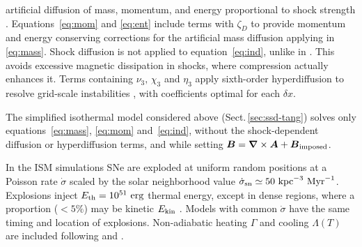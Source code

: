 \documentclass[preprint2]{aastex63}
\newcommand\SNr{\dot\sigma_{\rm sn}}
\newcommand\ESK{E_{\rm kin}}
\newcommand\EST{E_{\rm th}}
\newcommand{\vect}[1]{{{\mbox{\boldmath $#1$}}}}%
\newcommand\kpc{~ {\rm kpc}}
\newcommand\dx{ {\delta x}}
\newcommand\Myr{~ {\rm Myr}}
\newcommand\erg{~ {\rm erg}}
\newcommand{\fg}[1]{\textcolor{midgreen}{#1}}
\begin{document}
 artificial diffusion of mass, momentum, and energy proportional to shock
 strength \citep[see][for details]{GMKSH20}.
 \fg{Equations~\eqref{eq:mom} and \eqref{eq:ent} include terms with $\zeta_D$}
 \fg{to} \fg{provide momentum and energy conserving corrections for} \fg{the}
 \fg{artificial mass diffusion applying in \eqref{eq:mass}.}
 Shock diffusion is not applied to equation~\eqref{eq:ind}\fg{, unlike} \fg{in}
 \fg{\citet{Gent:2013b}.} \fg{This avoids} \fg{excessive magnetic dissipation in
 shocks, where compression actually enhances it.}
 Terms containing $\nu_3,\,\chi_3$ and $\eta_3$ apply sixth-order hyperdiffusion
 to resolve grid-scale instabilities \citep[see, e.g.,][]{ABGS02,HB04}, \fg{
 with coefficients optimal for each $\dx$}.

 \fg{The simplified isothermal model considered above
 (Sect.\,\ref{sec:ssd-tang}) solves only equations~\fg{\eqref{eq:mass},}
 \eqref{eq:mom} and~\eqref{eq:ind}, without the shock-dependent diffusion or
 hyperdiffusion terms, and while setting
 $\vect{B}=\vect\nabla\times\vect{A}+\vect{B}_{\rm imposed}$.}

 \fg{In the ISM simulations} SNe are exploded at \fg{uniform} random positions
 at a Poisson rate $\dot\sigma$ \fg{scaled by} the solar neighborhood
 value $\SNr\simeq 50\kpc^{-3}\Myr^{-1}$.
 Explosions inject $\EST = 10^{51}\erg$ thermal energy, except in
 dense regions, where a proportion \fg{($<5\%$) may be} kinetic $\ESK$ 
 \citep[see][]{GMKSH20}.
 \fg{Models with common $\dot\sigma$ have the same timing and location of
 explosions.}
 Non-adiabatic heating $\Gamma$ and cooling $\Lambda (T)$ are included
 \citep{Gent:2013b} following \citet{Wolfire:1995} and \citet{Sarazin:1987}.
\end{document}
